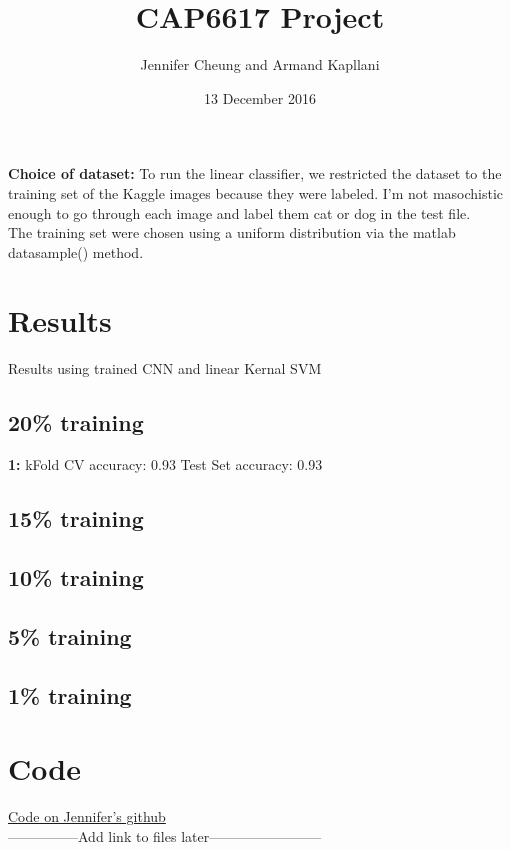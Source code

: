 \documentclass{article}
\title{CAP6617 Project}
\date{13 December 2016}
\author{Jennifer Cheung and Armand Kapllani}
\begin{document}
	\maketitle
	\textbf{Choice of dataset:}  To run the linear classifier, we restricted the dataset to the training set of the Kaggle images because they were labeled. I'm not masochistic enough to go through each image and label them cat or dog in the test file. \\
	The training set were chosen using a uniform distribution via the matlab datasample() method. \\

	\section{Results}
	Results using trained CNN and linear Kernal SVM
	\subsection{20\% training}
	\textbf{1:} kFold CV accuracy: 0.93  \indent Test Set accuracy: 0.93
	\subsection{15\% training}
	\subsection{10\% training}
	\subsection{5\% training}
	\subsection{1\% training}

	\section{Code}
	\setlength\parindent{34pt} \href{https://github.com/jenncheung/Advance-Machine-Learning-Project}{Code on Jennifer's github} \\
	 ---------------Add link to files later------------------------
\end{document}
